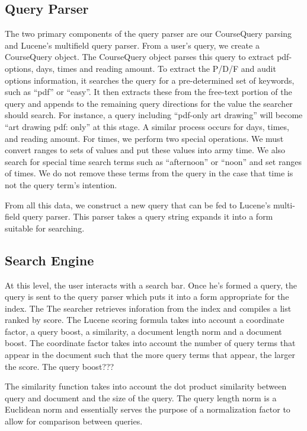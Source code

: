 \documentclass[12pt,letterpaper]{article}
\begin{document}
\subsection{Query Parser}
	

The two primary components of the query parser are our CourseQuery parsing and Lucene's multifield query parser. From a user's query, we create a CourseQuery object. The CourseQuery object parses this query to extract pdf-options, days, times and reading amount. To extract the P/D/F and audit options information, it searches the query for a pre-determined set of keywords, such as ``pdf'' or ``easy''. It then extracts these from the free-text portion of the query and appends to the remaining query directions for the value the searcher should search. For instance, a query including ``pdf-only art drawing'' will become ``art drawing pdf: only'' at this stage. A similar process occurs for days, times, and reading amount. For times, we perform two special operations. We must convert ranges to sets of values and put these values into army time. We also search for special time search terms such as ``afternoon'' or ``noon'' and set ranges of times. We do not remove these terms from the query in the case that time is not the query term's intention. 

From all this data, we construct a new query that can be fed to Lucene's multi-field query parser. This parser takes a query string expands it into a form suitable for searching. 
	
\subsection{Search Engine}
At this level, the user interacts with a search bar. Once he's formed a query, the query is sent to the query parser which puts it into a form appropriate for the index. The The searcher retrieves inforation from the index and compiles a list ranked by score. The Lucene scoring formula takes into account a coordinate factor, a query boost, a similarity, a document length norm and a document boost. 
The coordinate factor takes into account the number of query terms that appear in the document such that the more query terms that appear, the larger the score. 
The query boost???

The similarity function takes into account the dot product similarity between query and document and the size of the query. The query length norm is a Euclidean norm and essentially serves the purpose of a normalization factor to allow for comparison between queries.
				
\end{document}
